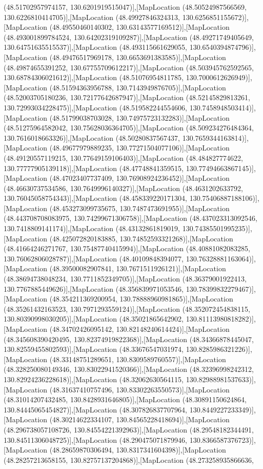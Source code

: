 (48.51702957974157, 130.6201919515047)],[MapLocation (48.50524987566569, 130.6226810414705)],[MapLocation (48.49927846324313, 130.6256851155672)],[MapLocation (48.49550460140302, 130.63143577169512)],[MapLocation (48.493001899784524, 130.64202319109287)],[MapLocation (48.49271749405649, 130.64751635515537)],[MapLocation (48.493115661629055, 130.6540394874796)],[MapLocation (48.49476517969178, 130.6653691383585)],[MapLocation (48.49874655391252, 130.67755709612217)],[MapLocation (48.503945762592565, 130.68784306021612)],[MapLocation (48.51076954811785, 130.7000612626949)],[MapLocation (48.51594363956788, 130.7143949876705)],[MapLocation (48.52003705180236, 130.72177642687947)],[MapLocation (48.52145829813261, 130.72993034228475)],[MapLocation (48.519582244554606, 130.7458948503414)],[MapLocation (48.51799038703028, 130.74975723132283)],[MapLocation (48.51275964582042, 130.75628036364705)],[MapLocation (48.509234276484364, 130.7616018663326)],[MapLocation (48.50280837567437, 130.7659344163814)],[MapLocation (48.49677979889235, 130.77271504077106)],[MapLocation (48.49120557119215, 130.77649159106403)],[MapLocation (48.484827774622, 130.77777905139118)],[MapLocation (48.47748841359515, 130.77494663867145)],[MapLocation (48.47023407737409, 130.76908924236452)],[MapLocation (48.46630737534586, 130.7649996140327)],[MapLocation (48.4631202633792, 130.76045058754343)],[MapLocation (48.458339220171304, 130.75406887188106)],[MapLocation (48.453273099735675, 130.7487473691955)],[MapLocation (48.443708708083975, 130.74299671306758)],[MapLocation (48.437023313092546, 130.7418809141174)],[MapLocation (48.43132861819019, 130.74385501995235)],[MapLocation (48.425072820183885, 130.74852593321268)],[MapLocation (48.41664246271767, 130.75487740415994)],[MapLocation (48.40881082083285, 130.76062806028787)],[MapLocation (48.40109848394077, 130.76328881163064)],[MapLocation (48.39500082907841, 130.7671511926121)],[MapLocation (48.38694738048234, 130.7711852349705)],[MapLocation (48.36379001922413, 130.7767885449626)],[MapLocation (48.356839971053546, 130.78399832279467)],[MapLocation (48.354211369200954, 130.78888960981865)],[MapLocation (48.35261432163523, 130.7971293559124)],[MapLocation (48.352072454838115, 130.80390998030205)],[MapLocation (48.35021865642902, 130.81113980818282)],[MapLocation (48.34702426095142, 130.82148240614424)],[MapLocation (48.345608390420495, 130.82374919822368)],[MapLocation (48.34366878445047, 130.82559455802593)],[MapLocation (48.33676547031974, 130.8285986321226)],[MapLocation (48.33148751289651, 130.8309589760557)],[MapLocation (48.328250080149346, 130.83022941520366)],[MapLocation (48.32396998242312, 130.82924236228618)],[MapLocation (48.32062630564115, 130.82988981537633)],[MapLocation (48.31637410757496, 130.83302263550573)],[MapLocation (48.31014207432485, 130.8428931646805)],[MapLocation (48.30891150624864, 130.84445065454827)],[MapLocation (48.307826837707964, 130.8449227233349)],[MapLocation (48.30214622334107, 130.84565228418694)],[MapLocation (48.296738057108726, 130.84554221392963)],[MapLocation (48.29548182344491, 130.84511306048725)],[MapLocation (48.290475071879946, 130.8366587376723)],[MapLocation (48.28659870306494, 130.8317341604398)],[MapLocation (48.28257213658155, 130.82757137204868)],[MapLocation (48.273258935866636, 